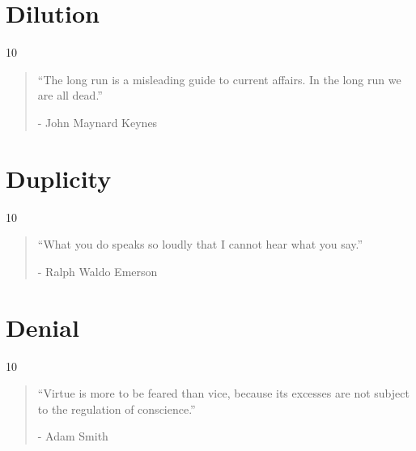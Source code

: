 \chapter{Dilution} %

\vspace{-1.3cm}
\begin{localsize}{10}
	\begin{quote}
		“The long run is a misleading guide to current affairs. In the long run we are all dead.” 
		\begin{flushright}- John Maynard Keynes \end{flushright}
	\end{quote} 
\end{localsize}
\vspace{1cm}

\chapter{Duplicity} %

\vspace{-1.3cm}
\begin{localsize}{10}
	\begin{quote}
		“What you do speaks so loudly that I cannot hear what you say.”
		\begin{flushright}- Ralph Waldo Emerson \end{flushright}
	\end{quote} 
\end{localsize}
\vspace{1cm}

\chapter{Denial} %

\vspace{-1.3cm}
\begin{localsize}{10}
  \begin{quote}
	“Virtue is more to be feared than vice, because its excesses are not subject to the regulation of conscience.”
	\begin{flushright}- Adam Smith \end{flushright}
  \end{quote} 
\end{localsize}
\vspace{1cm}

